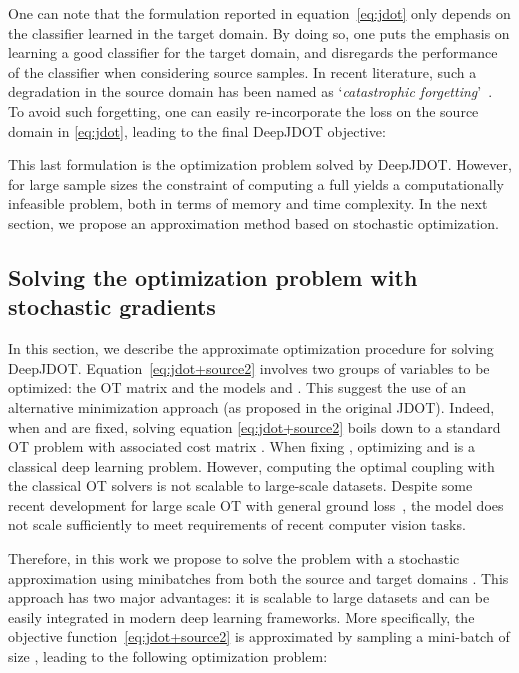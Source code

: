 \documentclass[runningheads]{llncs}
\begin{document}
One can note that the formulation reported in equation~\eqref{eq:jdot} only depends on the classifier learned in the target domain. By doing so, one puts the emphasis on learning a good classifier for the target domain, and disregards the performance of the classifier when considering source samples. In recent literature, such a degradation in the source domain has been named as `\emph{catastrophic forgetting}'~\cite{Shm17,Li18}. To avoid such forgetting, one can easily re-incorporate the loss on the source domain in \eqref{eq:jdot}, leading to the final DeepJDOT objective:

 
This last formulation is the optimization problem solved by DeepJDOT. However, for large sample sizes the constraint of computing a full  yields a computationally infeasible problem, both in terms of memory and time complexity. In the next section, we propose an approximation method based on stochastic optimization.


\subsection{Solving the optimization problem with stochastic gradients}
\label{sec:}
In this section, we describe the {approximate} optimization procedure for solving DeepJDOT. {Equation~\eqref{eq:jdot+source2} involves} two groups of variables to be optimized: the OT matrix  and the models  and . This suggest the use of an alternative minimization approach (as proposed in the original JDOT). 
Indeed,  when  and  are fixed, solving equation \eqref{eq:jdot+source2} boils down to {a standard} OT problem with associated cost matrix . When fixing , optimizing  and  is a classical deep learning problem. 
However, computing the optimal coupling with the classical OT solvers is not scalable to large-scale datasets. Despite some recent development for large scale OT with general ground loss~\cite{genevay2016,seguy2018}, the model does not scale sufficiently to meet requirements of recent computer vision tasks.

Therefore, in this work we propose to solve the problem with a stochastic approximation using minibatches from both the source and target domains \cite{genevay2017sinkhorn}. This approach has two major advantages: it is scalable to large datasets and can be easily integrated in modern deep learning frameworks.
More specifically, the objective function~\eqref{eq:jdot+source2} is approximated by sampling a mini-batch of size , {leading to the following optimization problem:}
 
\end{document}
